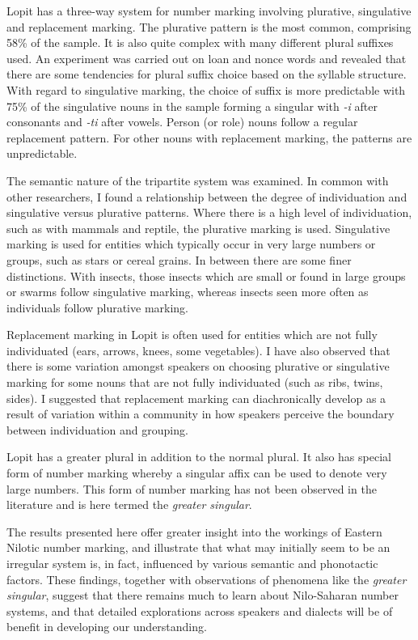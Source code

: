\documentclass[output=paper]{langsci/langscibook}
\begin{document}
Lopit has a three-way system for number marking involving plurative, singulative and replacement marking. The plurative pattern is the most common, comprising 58\% of the sample. It is also quite complex with many different plural suffixes used. An experiment was carried out on loan and nonce words and revealed that there are some tendencies for plural suffix choice based on the syllable structure. With regard to singulative marking, the choice of suffix is more predictable with 75\% of the singulative nouns in the sample forming a singular with \textit{{}-i} after consonants and \textit{{}-ti} after vowels. Person (or role) nouns follow a regular replacement pattern. For other nouns with replacement marking, the patterns are unpredictable.

The semantic nature of the tripartite system was examined. In common with other researchers, I found a relationship between the degree of individuation and singulative versus plurative patterns. Where there is a high level of individuation, such as with mammals and reptile, the plurative marking is used. Singulative marking is used for entities which typically occur in very large numbers or groups, such as stars or cereal grains. In between there are some finer distinctions. With insects, those insects which are small or found in large groups or swarms follow singulative marking, whereas insects seen more often as individuals follow plurative marking.

Replacement marking in Lopit is often used for entities which are not fully individuated (ears, arrows, knees, some vegetables). I have also observed that there is some variation amongst speakers on choosing plurative or singulative marking for some nouns that are not fully individuated (such as ribs, twins, sides). I suggested that replacement marking can diachronically develop as a result of variation within a community in how speakers perceive the boundary between individuation and grouping.

Lopit has a greater plural in addition to the normal plural. It also has special form of number marking whereby a singular affix can be used to denote very large numbers. This form of number marking has not been observed in the literature and is here termed the \textit{greater singular}.

The results presented here offer greater insight into the workings of Eastern Nilotic number marking, and illustrate that what may initially seem to be an irregular system is, in fact, influenced by various semantic and phonotactic factors. These findings, together with observations of phenomena like the \textit{greater singular}, suggest that there remains much to learn about Nilo-Saharan number systems, and that detailed explorations across speakers and dialects will be of benefit in developing our understanding. 
\end{document}
